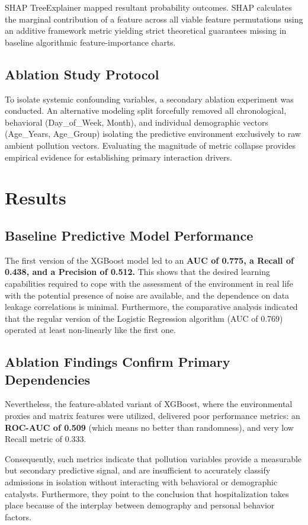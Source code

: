 \documentclass[conference]{IEEEtran}
\begin{document}
SHAP TreeExplainer mapped resultant probability outcomes. SHAP calculates the marginal contribution of a feature across all viable feature permutations using an additive framework metric yielding strict theoretical guarantees missing in baseline algorithmic feature-importance charts.

\subsection{Ablation Study Protocol}
To isolate systemic confounding variables, a secondary ablation experiment was conducted. An alternative modeling split forcefully removed all chronological, behavioral (Day\_of\_Week, Month), and individual demographic vectors (Age\_Years, Age\_Group) isolating the predictive environment exclusively to raw ambient pollution vectors. Evaluating the magnitude of metric collapse provides empirical evidence for establishing primary interaction drivers.

\section{Results}
\subsection{Baseline Predictive Model Performance}
The first version of the XGBoost model led to an \textbf{AUC of 0.775, a Recall of 0.438, and a Precision of 0.512.} This shows that the desired learning capabilities required to cope with the assessment of the environment in real life with the potential presence of noise are available, and the dependence on data leakage correlations is minimal. Furthermore, the comparative analysis indicated that the regular version of the Logistic Regression algorithm (AUC of 0.769) operated at least non-linearly like the first one. 

\subsection{Ablation Findings Confirm Primary Dependencies}
Nevertheless, the feature-ablated variant of XGBoost, where the environmental proxies and matrix features were utilized, delivered poor performance metrics: an \textbf{ROC-AUC of 0.509} (which means no better than randomness), and very low Recall metric of 0.333.

Consequently, such metrics indicate that pollution variables provide a measurable but secondary predictive signal, and are insufficient to accurately classify admissions in isolation without interacting with behavioral or demographic catalysts. Furthermore, they point to the conclusion that hospitalization takes place because of the interplay between demography and personal behavior factors. 
\end{document}
